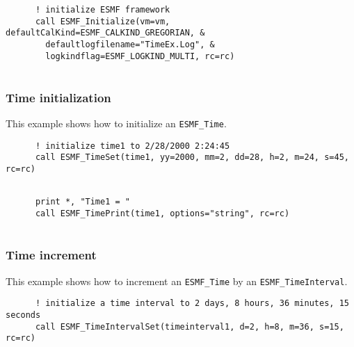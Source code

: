 
 \begin{verbatim}
      ! initialize ESMF framework
      call ESMF_Initialize(vm=vm, defaultCalKind=ESMF_CALKIND_GREGORIAN, &
        defaultlogfilename="TimeEx.Log", &
        logkindflag=ESMF_LOGKIND_MULTI, rc=rc)
 
\end{verbatim}
 

  \subsubsection{Time initialization}
 
   This example shows how to initialize an {\tt ESMF\_Time}. 

 \begin{verbatim}
      ! initialize time1 to 2/28/2000 2:24:45
      call ESMF_TimeSet(time1, yy=2000, mm=2, dd=28, h=2, m=24, s=45, rc=rc)
 
\end{verbatim}
 

 \begin{verbatim}
      print *, "Time1 = "
      call ESMF_TimePrint(time1, options="string", rc=rc)
 
\end{verbatim}
 

  \subsubsection{Time increment}
 
   This example shows how to increment an {\tt ESMF\_Time} by
   an {\tt ESMF\_TimeInterval}. 

 \begin{verbatim}
      ! initialize a time interval to 2 days, 8 hours, 36 minutes, 15 seconds
      call ESMF_TimeIntervalSet(timeinterval1, d=2, h=8, m=36, s=15, rc=rc)
 
\end{verbatim}
 
